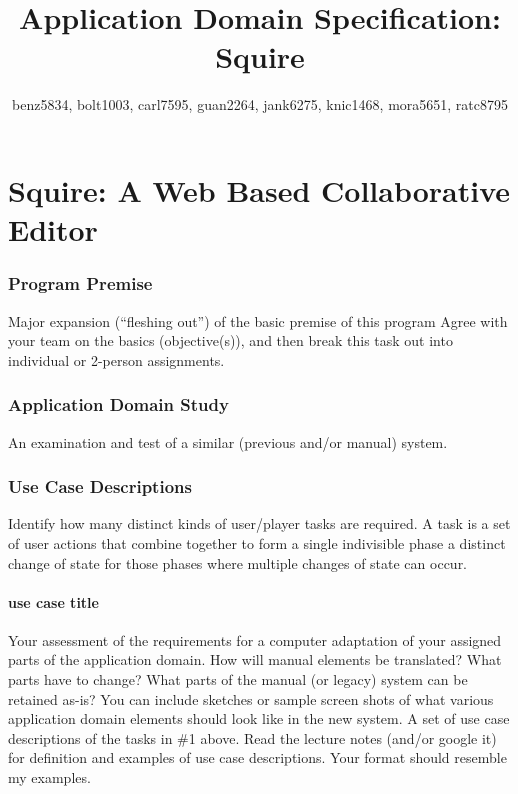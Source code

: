 \documentclass[11pt]{report}
\begin{document}
\title{Application Domain Specification: Squire}
\author{benz5834, bolt1003, carl7595, guan2264, jank6275, knic1468, mora5651, ratc8795}
\maketitle

\tableofcontents

\part{Squire: A Web Based Collaborative Editor}

\section{Program Premise}
Major expansion (``fleshing out'') of the basic premise of this program Agree with your team on the basics (objective(s)), and then break this task out into individual or 2-person assignments.

\section{Application Domain Study}
An examination and test of a similar (previous and/or manual) system.

\section{Use Case Descriptions}
Identify how many distinct kinds of user/player tasks are required. A task is a set of user actions that combine together to form a single indivisible phase a distinct change of state for those phases where multiple changes of state can occur.

\subsection{use case title}
Your assessment of the requirements for a computer adaptation of your assigned parts of the application domain. How will manual elements be translated? What parts have to change? What parts of the manual (or legacy) system can be retained as-is? You can include sketches or sample screen shots of what various application domain elements should look like in the new system.
A set of use case descriptions of the tasks in \#1 above. Read the lecture notes (and/or google it) for definition and examples of use case descriptions. Your format should resemble my examples.
\end{document}

